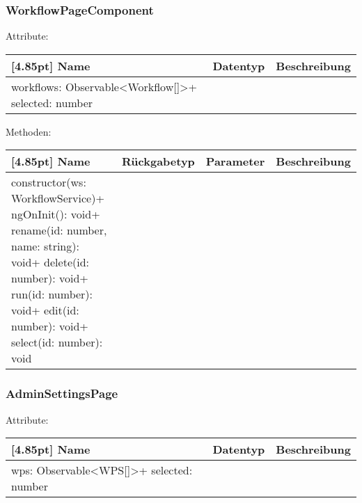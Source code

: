         	\subsubsection{WorkflowPageComponent}
        	
        	    Attribute:
                \begin{center}
                	\renewcommand{\arraystretch}{1.5}
                    \setlength\tabcolsep{5pt}
                	\begin{tabularx}{\textwidth}{|l|l|X|}
                		\hline
                        \rowcolor[gray]{0.75}[4.85pt]            		
                        Name & Datentyp & Beschreibung \\ \hline
                        workflows: Observable<Workflow[]>+ selected: number
                        & &  \\ \hline
                	\end{tabularx}
                \end{center}
                
                Methoden:
        		\begin{center}
                \setlength\tabcolsep{5pt}
                	\renewcommand{\arraystretch}{1.5}
                    	\begin{tabularx}{\textwidth}{|l|l|l|X|}
                    	\hline
                    	\rowcolor[gray]{0.75}[4.85pt]
                		Name & Rückgabetyp & Parameter & Beschreibung \\ \hline
                		constructor(ws: WorkflowService)+ ngOnInit(): void+ rename(id: number, name: string): void+ delete(id: number): void+ run(id: number): void+ edit(id: number): void+ select(id: number): void
                        & & &  \\ \hline
                        \end{tabularx}
        		\end{center}
        	
        	\subsubsection{AdminSettingsPage}
        	
        	    Attribute:
                \begin{center}
                	\renewcommand{\arraystretch}{1.5}
                    \setlength\tabcolsep{5pt}
                	\begin{tabularx}{\textwidth}{|l|l|X|}
                		\hline
                        \rowcolor[gray]{0.75}[4.85pt]            		
                        Name & Datentyp & Beschreibung \\ \hline
                        wps: Observable<WPS[]>+ selected: number
                        & &  \\ \hline
                	\end{tabularx}
                \end{center}
                
